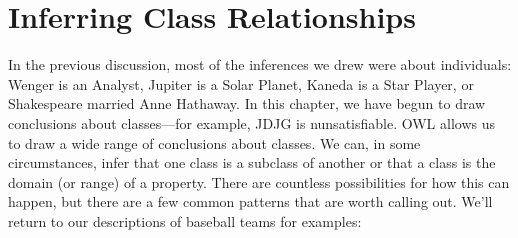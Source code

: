 \section{Inferring Class Relationships}

In the previous discussion, most of the inferences we drew were about
individuals: Wenger is an Analyst, Jupiter is a Solar Planet, Kaneda is
a Star Player, or Shakespeare married Anne Hathaway. In this chapter, we
have begun to draw conclusions about classes---for example, JDJG is
nunsatisfiable. OWL allows us to draw a wide range of conclusions about
classes. We can, in some circumstances, infer that one class is a
subclass of another or that a class is the domain (or range) of a
property. There are countless possibilities for how this can happen, but
there are a few common patterns that are worth calling out. We'll return
to our descriptions of baseball teams for examples:

